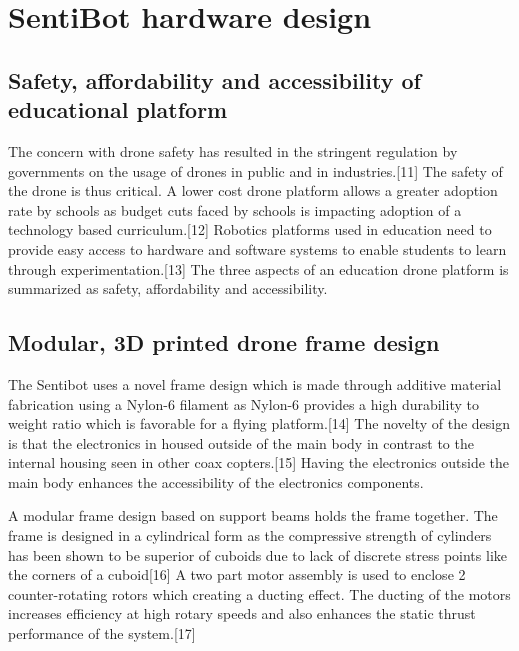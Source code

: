 \documentclass[12pt]{article}
\begin{document}
\section{SentiBot hardware design}

\subsection{Safety, affordability and accessibility of educational platform}

The concern with drone safety has resulted in the stringent regulation by governments on the usage of drones in public and in industries.[11] The safety of the drone is thus critical. A lower cost drone platform allows a greater adoption rate by schools as budget cuts faced by schools is impacting adoption of a technology based curriculum.[12] Robotics platforms used in education need to provide easy access to hardware and software systems to enable students to learn through experimentation.[13] The three aspects of an education drone platform is summarized as safety, affordability and accessibility. 

\subsection{Modular, 3D printed drone frame design}

The Sentibot uses a novel frame design which is made through additive material fabrication using a Nylon-6 filament as Nylon-6 provides a high durability to weight ratio which is favorable for a flying platform.[14] The novelty of the design is that the electronics in housed outside of the main body in contrast to the internal housing seen in other coax copters.[15] Having the electronics outside the main body enhances the accessibility of the electronics components. 

A modular frame design based on support beams holds the frame together. The frame is designed in a cylindrical form as the compressive strength of cylinders has been shown to be superior of cuboids due to lack of discrete stress points like the corners of a cuboid[16] A two part motor assembly is used to enclose 2 counter-rotating rotors which creating a ducting effect. The ducting of the motors increases efficiency at high rotary speeds and also enhances the static thrust performance of the system.[17] 
\end{document}
